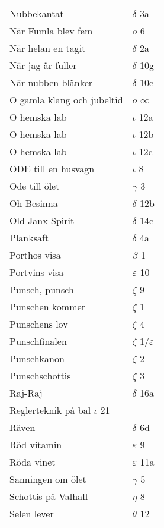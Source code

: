 \documentclass[a6paper,10pt]{article}
\begin{document}
\newpage
\begin{table}[!h]
\begin{tabular}{l l}
Nubbekantat&	$\delta$ 3a\\
När Fumla blev fem&  $o$ 6\\
När helan en tagit	&$\delta$ 2a\\
När jag är fuller&	$\delta$ 10g\\
När nubben blänker&	$\delta$ 10e\\
O gamla klang och jubeltid&	$o$ $\infty$\\
O hemska lab&	$\iota$ 12a\\
O hemska lab&	$\iota$ 12b\\
O hemska lab&	$\iota$ 12c\\
ODE till en husvagn	&$\iota$ 8\\
Ode till ölet&	$\gamma$ 3\\
Oh Besinna&	$\delta$ 12b\\
Old Janx Spirit&	$\delta$ 14c\\
Planksaft	&$\delta$ 4a\\
Porthos visa&	$\beta$ 1\\
Portvins visa	&$\varepsilon$ 10\\
Punsch, punsch	&$\zeta$ 9\\
Punschen kommer&	$\zeta$ 1\\
Punschens lov&	$\zeta$ 4\\
Punschfinalen	&$\zeta$ 1/$\varepsilon$\\
Punschkanon&	$\zeta$ 2\\
Punschschottis	&$\zeta$ 3\\
Raj-Raj&	$\delta$ 16a\\
Reglerteknik på bal $\iota$ 21\\
Räven&	$\delta$ 6d\\
Röd vitamin	&$\varepsilon$ 9\\
Röda vinet&	$\varepsilon$ 11a\\
Sanningen om ölet&	$\gamma$ 5\\
Schottis på Valhall&	$\eta$ 8\\
Selen lever	&$\theta$ 12\\
\end{tabular}
\end{table}
\end{document}
